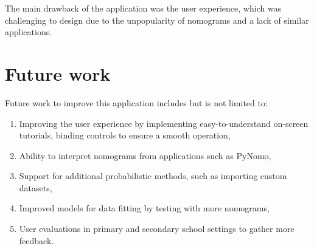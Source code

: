 \documentclass{l4proj}
\begin{document}
The main drawback of the application was the user experience, which was challenging to design due to the unpopularity of nomograms and a lack of similar applications. 

\section{Future work}

Future work to improve this application includes but is not limited to:
\begin{enumerate}
    \item Improving the user experience by implementing easy-to-understand on-screen tutorials, binding controls to ensure a smooth operation,
    \item Ability to interpret nomograms from applications such as PyNomo,
    \item Support for additional probabilistic methods, such as importing custom datasets,
    \item Improved models for data fitting by testing with more nomograms, 
    \item User evaluations in primary and secondary school settings to gather more feedback. 
    
\end{enumerate}

%
% 
\end{document}
